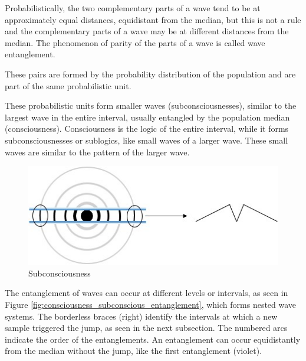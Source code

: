 Probabilistically, the two complementary parts of a wave tend to be at approximately equal distances, equidistant from the median, but this is not a rule and the complementary parts of a wave may be at different distances from the median. The phenomenon of parity of the parts of a wave is called wave entanglement.

These pairs are formed by the probability distribution of the population and are part of the same probabilistic unit.

These probabilistic units form smaller waves (subconsciousnesses), similar to the largest wave in the entire interval, usually entangled by the population median (consciousness). Consciousness is the logic of the entire interval, while it forms subconsciousnesses or sublogics, like small waves of a larger wave. These small waves are similar to the pattern of the larger wave.
	\begin{figure}[H]
	\caption{Subconsciousness}
	\label{fig:consciousness_subconscious}
	\centering
	\includegraphics[scale=.8]{sections/images/consciousness_subconscious.jpg}
	\end{figure}
	
The entanglement of waves can occur at different levels or intervals, as seen in Figure \ref{fig:consciousness_subconscious_entanglement}, which forms nested wave systems. The borderless braces (right) identify the intervals at which a new sample triggered the jump, as seen in the next subsection. The numbered arcs indicate the order of the entanglements. An entanglement can occur equidistantly from the median without the jump, like the first entanglement (violet).

